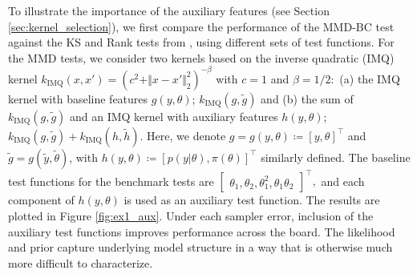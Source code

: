\documentclass{article}
\begin{document}

To illustrate the importance of the auxiliary features (see Section \ref{sec:kernel_selection}), we first compare the performance of the MMD-BC test against the KS and Rank tests from \cite{gandy_unit_2020}, using different sets of test functions. 
For the MMD tests, we consider two kernels based on the inverse quadratic (IMQ) kernel $k_{\text{IMQ}}(x, x') = (c^{2} + \Vert x - x' \Vert_{2}^{2})^{-\beta}$ with $c=1$ and $\beta=1/2:$ 
(a) the IMQ kernel with baseline features $g(y, \theta)$; $k_{\mathrm{IMQ}}(g, \tilde{g})$ and 
(b) the sum of $k_{\mathrm{IMQ}}(g, \tilde{g})$ and an IMQ kernel with auxiliary features $h(y, \theta)$; $k_{\mathrm{IMQ}}(g, \tilde{g}) + k_{\mathrm{IMQ}}(h, \tilde{h})$. 
Here, we denote $g=g(y, \theta)\coloneqq[y, \theta]^{\top}$ and $\tilde{g}=g(\tilde{y}, \tilde{\theta})$, with $h(y, \theta)\coloneqq[p(y|\theta), \pi(\theta)]^{\top}$ similarly defined. 
The baseline test functions for the benchmark tests are $\begin{bmatrix} \theta_{1}, \theta_{2}, \theta_{1}^{2}, \theta_{1}\theta_{2} \end{bmatrix}^\top,$ and each component of $h(y, \theta)$ is used as an auxiliary test function. 
The results are plotted in Figure \ref{fig:ex1_aux}. Under each sampler error, inclusion of the auxiliary test functions improves performance across the board. 
The likelihood and prior capture underlying model structure in a way that is otherwise much more difficult to characterize.
\end{document}
